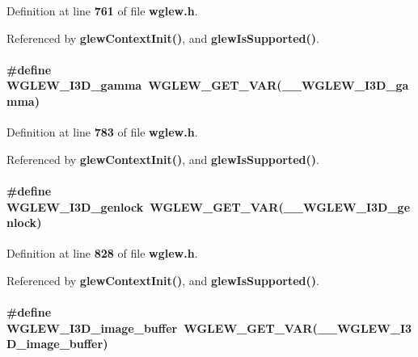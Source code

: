 Definition at line {\bf 761} of file {\bf wglew.\+h}.



Referenced by {\bf glew\+Context\+Init()}, and {\bf glew\+Is\+Supported()}.

\paragraph[{W\+G\+L\+E\+W\+\_\+\+I3\+D\+\_\+gamma}]{\setlength{\rightskip}{0pt plus 5cm}\#define W\+G\+L\+E\+W\+\_\+\+I3\+D\+\_\+gamma~{\bf W\+G\+L\+E\+W\+\_\+\+G\+E\+T\+\_\+\+V\+AR}({\bf \+\_\+\+\_\+\+W\+G\+L\+E\+W\+\_\+\+I3\+D\+\_\+gamma})}\label{wglew_8h_a17b5e04a1e368f788d3ff908515e2e78}


Definition at line {\bf 783} of file {\bf wglew.\+h}.



Referenced by {\bf glew\+Context\+Init()}, and {\bf glew\+Is\+Supported()}.

\paragraph[{W\+G\+L\+E\+W\+\_\+\+I3\+D\+\_\+genlock}]{\setlength{\rightskip}{0pt plus 5cm}\#define W\+G\+L\+E\+W\+\_\+\+I3\+D\+\_\+genlock~{\bf W\+G\+L\+E\+W\+\_\+\+G\+E\+T\+\_\+\+V\+AR}({\bf \+\_\+\+\_\+\+W\+G\+L\+E\+W\+\_\+\+I3\+D\+\_\+genlock})}\label{wglew_8h_a0a291e39c01c37a97fa96fd53ecc270e}


Definition at line {\bf 828} of file {\bf wglew.\+h}.



Referenced by {\bf glew\+Context\+Init()}, and {\bf glew\+Is\+Supported()}.

\paragraph[{W\+G\+L\+E\+W\+\_\+\+I3\+D\+\_\+image\+\_\+buffer}]{\setlength{\rightskip}{0pt plus 5cm}\#define W\+G\+L\+E\+W\+\_\+\+I3\+D\+\_\+image\+\_\+buffer~{\bf W\+G\+L\+E\+W\+\_\+\+G\+E\+T\+\_\+\+V\+AR}({\bf \+\_\+\+\_\+\+W\+G\+L\+E\+W\+\_\+\+I3\+D\+\_\+image\+\_\+buffer})}\label{wglew_8h_a95239d4d187c487064b2eeb050d8aed6}



